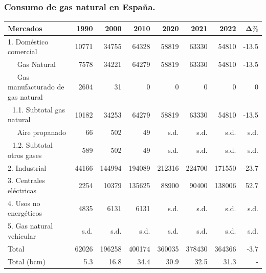 		\subsubsection{Consumo de gas natural en España.}
			\begin{table}[H]
				\renewcommand{\arraystretch}{1.2}
				\begin{tabular}{lrrrrrrr}
					\hline
					\textbf{Mercados} & \textbf{1990} & \textbf{2000} & \textbf{2010} & \textbf{2020} & \textbf{2021} & \textbf{2022} & $\mathbf{\Delta \%}$ \\
					\hline
					1. Doméstico comercial						& 10771 & 34755 & 64328 & 58819 & 63330 & 54810 & -13.5\\
					$\,\,\,\,\,\,$ Gas Natural						& 7578  & 34221 & 64279 & 58819 & 63330 & 54810 & -13.5\\
					$\,\,\,\,\,\,$ Gas manufacturado de gas natural	& 2604  & 31    & 0     & 0     & 0     & 0     & 0    \\
					$\,\,$ 1.1. Subtotal gas natural			& 10182 & 34253 & 64279 & 58819 & 63330 & 54810 & -13.5\\
					$\,\,\,\,\,\,$ Aire propanado					& 66    & 502   & 49    & s.d.  & s.d.  & s.d.  & s.d. \\
					$\,\,$ 1.2. Subtotal otros gases			& 589   & 502   & 49    & s.d.  & s.d.  & s.d.  & s.d. \\
					2. Industrial								& 44166 & 144994& 194089& 212316& 224700& 171550& -23.7\\
					3. Centrales eléctricas						& 2254  & 10379 & 135625& 88900 & 90400 & 138006& 52.7 \\
					4. Usos no energéticos						& 4835  & 6131  & 6131  & s.d.  & s.d.  & s.d.  & s.d. \\
					5. Gas natural vehicular					& s.d.  & s.d.  & s.d.  & s.d.  & s.d.  & s.d.  & s.d. \\
					\hline
					Total										& 62026 & 196258& 400174& 360035& 378430& 364366& -3.7\\
					Total (bcm)									& 5.3   & 16.8  & 34.4  & 30.9  & 32.5  & 31.3  & -   \\
					\hline
				\end{tabular}
			\end{table}
			
